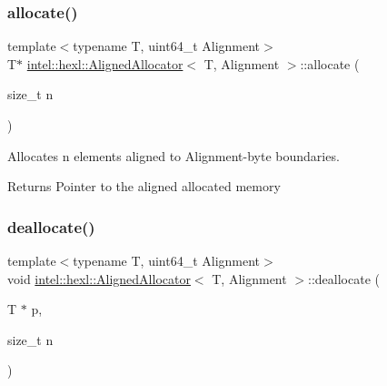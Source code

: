\subsubsection{\texorpdfstring{allocate()}{allocate()}}
{\footnotesize\ttfamily template$<$typename T, uint64\+\_\+t Alignment$>$ \\
T$\ast$ \hyperlink{classintel_1_1hexl_1_1AlignedAllocator}{intel\+::hexl\+::\+Aligned\+Allocator}$<$ T, Alignment $>$\+::allocate (\begin{DoxyParamCaption}\item[{size\+\_\+t}]{n }\end{DoxyParamCaption})\hspace{0.3cm}{\ttfamily [inline]}}



Allocates {\ttfamily n} elements aligned to Alignment-\/byte boundaries. 

\begin{DoxyReturn}{Returns}
Pointer to the aligned allocated memory 
\end{DoxyReturn}
\mbox{\label{classintel_1_1hexl_1_1AlignedAllocator_af370e3d86c582bcf1370656080bab1ec}} 
\subsubsection{\texorpdfstring{deallocate()}{deallocate()}}
{\footnotesize\ttfamily template$<$typename T, uint64\+\_\+t Alignment$>$ \\
void \hyperlink{classintel_1_1hexl_1_1AlignedAllocator}{intel\+::hexl\+::\+Aligned\+Allocator}$<$ T, Alignment $>$\+::deallocate (\begin{DoxyParamCaption}\item[{T $\ast$}]{p,  }\item[{size\+\_\+t}]{n }\end{DoxyParamCaption})\hspace{0.3cm}{\ttfamily [inline]}}

\mbox{\label{classintel_1_1hexl_1_1AlignedAllocator_a6b59d9d7304cda06b8c166dd865ff5db}} 
